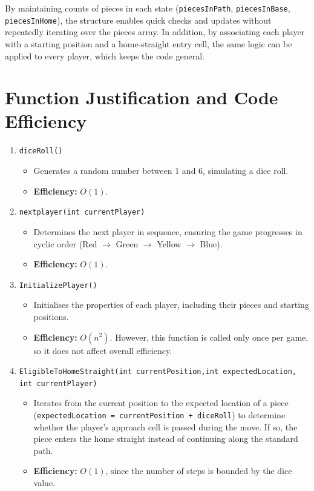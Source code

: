 \documentclass[11pt,a4paper]{article}
\newcommand{\code}[1]{\texttt{#1}}
\begin{document}
By maintaining counts of pieces in each state (\code{piecesInPath},
\code{piecesInBase}, \code{piecesInHome}), the structure enables quick checks
and updates without repeatedly iterating over the pieces array. In addition, by
associating each player with a starting position and a home-straight entry
cell, the same logic can be applied to every player, which keeps the code
general.

\section{Function Justification and Code Efficiency}

\begin{enumerate}[label=\arabic*.,leftmargin=*,itemsep=0.8em]

  \item \code{diceRoll()}
  \begin{itemize}[nosep]
    \item Generates a random number between 1 and 6, simulating a dice roll.
    \item \textbf{Efficiency:} $O(1)$.
  \end{itemize}

  \item \code{nextplayer(int currentPlayer)}
  \begin{itemize}[nosep]
    \item Determines the next player in sequence, ensuring the game progresses
          in cyclic order (Red $\rightarrow$ Green $\rightarrow$ Yellow
          $\rightarrow$ Blue).
    \item \textbf{Efficiency:} $O(1)$.
  \end{itemize}

  \item \code{InitializePlayer()}
  \begin{itemize}[nosep]
    \item Initialises the properties of each player, including their pieces
          and starting positions.
    \item \textbf{Efficiency:} $O(n^2)$. However, this function is called only
          once per game, so it does not affect overall efficiency.
  \end{itemize}

  \item \code{EligibleToHomeStraight(int currentPosition,}\newline\hspace*{1.5em}\code{int expectedLocation, int currentPlayer)}
  \begin{itemize}[nosep]
    \item Iterates from the current position to the expected location of a
          piece (\code{expectedLocation = currentPosition + diceRoll}) to
          determine whether the player's approach cell is passed during the
          move. If so, the piece enters the home straight instead of continuing
          along the standard path.
    \item \textbf{Efficiency:} $O(1)$, since the number of steps is bounded by
          the dice value.
  \end{itemize}


\end{enumerate}
\end{document}
